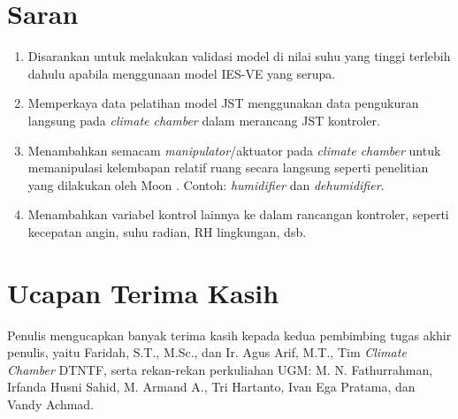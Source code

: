 \documentclass[a4paper,10pt]{article}
\newenvironment{body}{\begin{multicols}{2}}{\end{multicols}}
\begin{document}
\begin{body}
		\section{Saran}
		\begin{enumerate}
			\item Disarankan untuk melakukan validasi model di nilai suhu yang tinggi terlebih dahulu apabila menggunaan model IES-VE yang serupa.
			\item Memperkaya data pelatihan model JST menggunakan data pengukuran langsung pada \textit{climate chamber} dalam merancang JST kontroler.
			\item Menambahkan semacam \textit{manipulator}/aktuator pada \textit{climate chamber} untuk memanipulasi kelembapan relatif ruang secara langsung seperti penelitian yang dilakukan oleh Moon \cite{paper22JJkim}. Contoh: \textit{humidifier} dan \textit{dehumidifier}.
			\item Menambahkan variabel kontrol lainnya ke dalam rancangan kontroler, seperti kecepatan angin, suhu radian, RH lingkungan, dsb.
		\end{enumerate}
		\vspace{2mm}
		
		\section*{Ucapan Terima Kasih}
		Penulis mengucapkan banyak terima kasih kepada kedua pembimbing tugas akhir penulis, yaitu Faridah, S.T., M.Sc., dan Ir. Agus Arif, M.T., Tim \textit{Climate Chamber} DTNTF, serta rekan-rekan perkuliahan UGM: M. N. Fathurrahman, Irfanda Husni Sahid, M. Armand A., Tri Hartanto, Ivan Ega Pratama, dan Vandy Achmad.
		
		
		
	\end{body}
\end{document}
